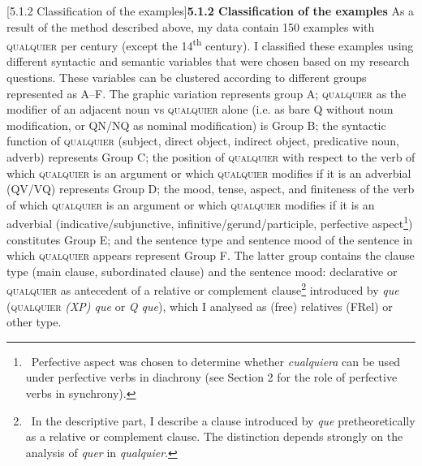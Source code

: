 \documentclass[10pt]{article}
\makeatletter
\renewcommand\subsubsection{\@startsection{subsubsection}{3}{0.0cm}{0in}{0.1mm}{\normalfont\normalsize\fontsize{12pt}{14.4pt}\selectfont}}
\newenvironment{styleStandard}{\renewcommand\baselinestretch{1.25}\setlength\leftskip{0cm}\setlength\rightskip{0cm}\setlength\parindent{0cm}\setlength\parfillskip{0pt plus 1fil}\setlength\parskip{0in plus 1pt}\writerlistparindent\writerlistleftskip\leavevmode\normalfont\normalsize\fontsize{12pt}{14.4pt}\selectfont\writerlistlabel\ignorespaces}{\unskip\vspace{0in plus 1pt}\par}
\newcommand\writerlistleftskip{}
\newcommand\writerlistparindent{}
\newcommand\writerlistlabel{}
\makeatother
\begin{document}
\subsubsection[5.1.2 Classification of the examples]{\textbf{5.1.2 Classification of the examples}}
\begin{styleStandard}
As a result of the method described above, my data contain 150 examples with \textsc{qualquier} per century (except the 14\textsuperscript{th} century). I classified these examples using different syntactic and semantic variables that were chosen based on my research questions. These variables can be clustered according to different groups represented as A–F. The graphic variation represents group A; \textsc{qualquier} as the modifier of an adjacent noun vs \textsc{qualquier} alone (i.e. as bare Q without noun modification, or QN/NQ as nominal modification) is Group B; the syntactic function of \textsc{qualquier} (subject, direct object, indirect object, predicative noun, adverb) represents Group C; the position of \textsc{qualquier} with respect to the verb of which \textsc{qualquier} is an argument or which \textsc{qualquier} modifies if it is an adverbial (QV/VQ) represents Group D; the mood, tense, aspect, and finiteness of the verb of which \textsc{qualquier} is an argument or which \textsc{qualquier} modifies if it is an adverbial (indicative/subjunctive, infinitive/gerund/participle, perfective aspect\footnote{\textrm{\ Perfective aspect was chosen to determine whether }\textrm{\textit{cualquiera}}\textrm{ can be used under perfective verbs in diachrony (see Section 2 for the role of perfective verbs in synchrony).}}) constitutes Group E; and the sentence type and sentence mood of the sentence in which \textsc{qualquier} appears represent Group F. The latter group contains the clause type (main clause, subordinated clause) and the sentence mood: declarative or \textsc{qualquier} as antecedent of a relative or complement clause\footnote{\ \textrm{In the descriptive part, I describe a clause introduced by }\textrm{\textit{que}}\textrm{ pretheoretically as a relative or complement clause. The distinction depends strongly on the analysis of }\textrm{\textit{quer}}\textrm{ in }\textrm{\textit{qualquier}}\textrm{.}} introduced by \textit{que} (\textsc{qualquier}\textit{ (XP) que} or\textit{ Q que}), which I analysed as (free) relatives (FRel) or other type.
\end{styleStandard}
\end{document}
